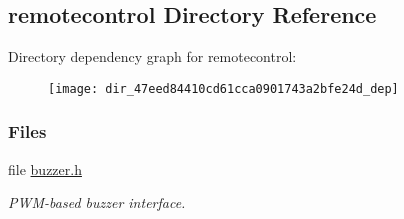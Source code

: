\subsection{remotecontrol Directory Reference}
\label{dir_47eed84410cd61cca0901743a2bfe24d}
Directory dependency graph for remotecontrol\+:
\nopagebreak
\begin{figure}[H]
\begin{center}
\leavevmode
\texttt{[image: dir\_47eed84410cd61cca0901743a2bfe24d\_dep]}
\end{center}
\end{figure}
\subsubsection*{Files}
\begin{DoxyCompactItemize}
\item 
file \hyperlink{buzzer_8h}{buzzer.\+h}
\begin{DoxyCompactList}\small\item\em P\+W\+M-\/based buzzer interface. \end{DoxyCompactList}\end{DoxyCompactItemize}

